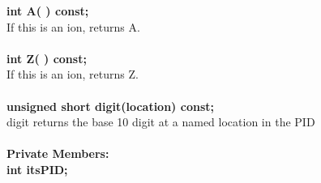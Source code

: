 \documentclass[twoside,12pt]{article}
\begin{document}
\begin{tabbing}
\hspace{0.5in}  {\bf int A( ) const; }\\
\hspace{0.5in}  If this is an ion, returns A.\\ \\
\hspace{0.5in}  {\bf int Z( ) const; }\\
\hspace{0.5in}  If this is an ion, returns Z.\\ \\
\hspace{0.5in}  {\bf unsigned short digit(location) const; }\\
\hspace{0.5in}  digit returns the base 10 digit at a named location in the PID \\ \\

{\bf Private Members:} \\
\hspace{0.5in}  {\bf int itsPID; } \\

\end{tabbing}


\vfill\eject
\end{document}
